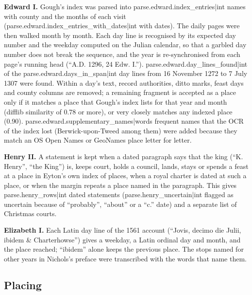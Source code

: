 \documentclass[11pt,a4paper]{article}
\begin{document}
\textbf{Edward I.} Gough's index was parsed into {{parse.edward.index_entries|int}} names with county and the months of each visit ({{parse.edward.index_entries_with_dates|int}} with dates). The daily pages were then walked month by month. Each day line is recognised by its expected day number and the weekday computed on the Julian calendar, so that a garbled day number does not break the sequence, and the year is re-synchronised from each page's running head (``A.D. 1296, 24 Edw. I.''). {{parse.edward.day_lines_found|int}} of the {{parse.edward.days_in_span|int}} day lines from 16 November 1272 to 7 July 1307 were found. Within a day's text, record authorities, ditto marks, feast days and county columns are removed; a remaining fragment is accepted as a place only if it matches a place that Gough's index lists for that year and month (difflib similarity of 0.78 or more), or very closely matches any indexed place (0.90). {{parse.edward.supplementary_names|words}} frequent names that the OCR of the index lost (Berwick-upon-Tweed among them) were added because they match an OS Open Names or GeoNames place letter for letter.

\textbf{Henry II.} A statement is kept when a dated paragraph says that the king (``K. Henry'', ``the King'') is, keeps court, holds a council, lands, stays or spends a feast at a place in Eyton's own index of places, when a royal charter is dated at such a place, or when the margin repeats a place named in the paragraph. This gives {{parse.henry_rows|int}} dated statements ({{parse.henry_uncertain|int}} flagged as uncertain because of ``probably'', ``about'' or a ``c.'' date) and a separate list of Christmas courts.

\textbf{Elizabeth I.} Each Latin day line of the 1561 account (``Jovis, decimo die Julii, ibidem \& Charterhowse'') gives a weekday, a Latin ordinal day and month, and the place reached; ``ibidem'' alone keeps the previous place. The stops named for other years in Nichols's preface were transcribed with the words that name them.

\subsection{Placing}
\end{document}
